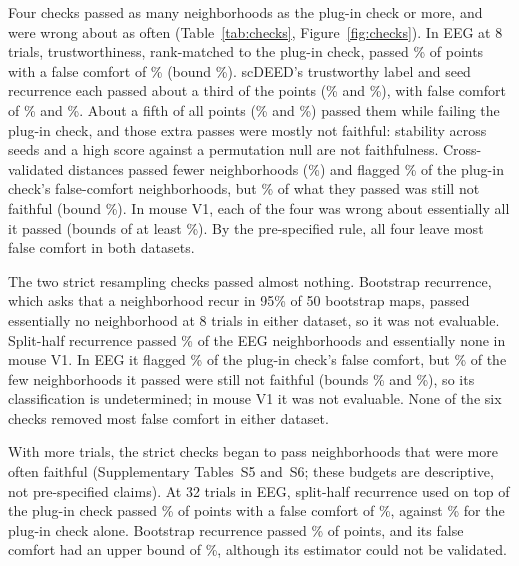 Four checks passed as many neighborhoods as the plug-in check or more, and were wrong about as
often (Table~\ref{tab:checks}, Figure~\ref{fig:checks}). In EEG at 8 trials, trustworthiness,
rank-matched to the plug-in check, passed \ChkEegTWPass\% of points with a false comfort of
\ChkEegTWFC\% (bound \ChkEegTWL\%). scDEED's trustworthy label and seed recurrence each passed
about a third of the points (\ChkEegSCDPass\% and \ChkEegSEEDPass\%), with false comfort of
\ChkEegSCDFC\% and \ChkEegSEEDFC\%. About a fifth of all points (\ChkEegExtraSCD\% and
\ChkEegExtraSEED\%) passed them while failing the plug-in check, and those extra passes were mostly not
faithful: stability across seeds and a high score against a permutation null are not faithfulness. Cross-validated distances
passed fewer neighborhoods (\ChkEegCVPass\%) and flagged \ChkEegCVCatch\% of the plug-in check's
false-comfort neighborhoods, but \ChkEegCVFC\% of what they passed was still not faithful (bound
\ChkEegCVL\%). In mouse V1, each of the four was wrong about essentially all it passed (bounds of
at least \ChkMouseMinL\%). By the pre-specified rule, all four leave most false comfort in both
datasets.

The two strict resampling checks passed almost nothing. Bootstrap recurrence, which asks that a
neighborhood recur in 95\% of 50 bootstrap maps, passed essentially no neighborhood at 8 trials in
either dataset, so it was not evaluable. Split-half recurrence passed \ChkEegSHPass\% of the EEG
neighborhoods and essentially none in mouse V1. In EEG it flagged \ChkEegSHCatch\% of the plug-in
check's false comfort, but \ChkEegSHFC\% of the few neighborhoods it passed were still not faithful
(bounds \ChkEegSHL\% and \ChkEegSHU\%), so its classification is undetermined; in mouse V1 it was not
evaluable. None of the six checks removed most false comfort in either dataset.

With more trials, the strict checks began to pass neighborhoods that were more often faithful
(Supplementary Tables~S5 and~S6; these budgets are descriptive, not pre-specified claims). At
32 trials in EEG, split-half recurrence used on top of the plug-in check passed
\ChkEegSHPassNXThirtyTwo\% of points with a false comfort of \ChkEegSHFCNXThirtyTwo\%, against
\EegFCthirtytwo\% for the plug-in check alone. Bootstrap recurrence passed
\ChkEegBOOTPassThirtyTwo\% of points, and its false comfort had an upper bound of
\ChkEegBOOTUThirtyTwo\%, although its estimator could not be validated.
